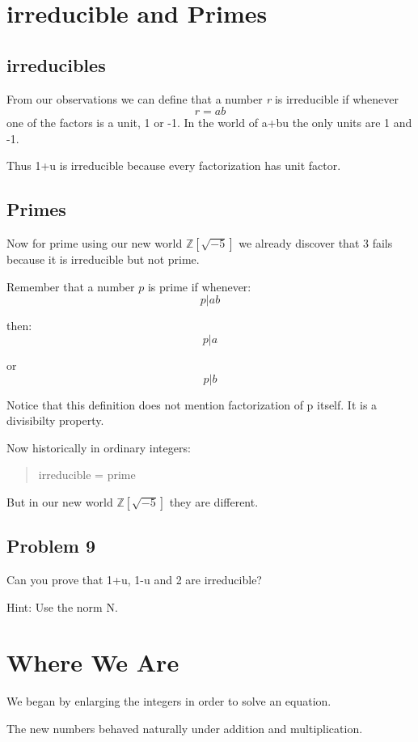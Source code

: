 \section{irreducible and Primes}

\subsection{irreducibles}

From our observations we can define that a number \textit{r} is irreducible if whenever
    \[r=ab\]
one of the factors is a unit, 1 or -1.
In the world of a+bu the only units are 1 and -1.

Thus 1+u is irreducible because every factorization has unit factor.

\subsection{Primes}

Now for prime using our new world $\mathbb{Z}[\sqrt{-5}]$
we already discover that 3 fails because it is irreducible but not
prime.

Remember that a number $\textit{p}$ is prime if whenever:
    \[p|ab\]

then:
    \[p|a\]

or \[p|b\]

Notice that this definition does not mention factorization of p itself. It is a divisibilty
property.

Now historically in ordinary integers:
    \begin{quote}
        irreducible = prime
    \end{quote}

But in our new world $\mathbb{Z}[\sqrt{-5}]$ they are different.

\subsection{Problem 9}
Can you prove that 1+u, 1-u and 2 are irreducible?

Hint: Use the norm N.


\section{Where We Are}

We began by enlarging the integers in order to solve an equation.

The new numbers behaved naturally under addition and multiplication.

